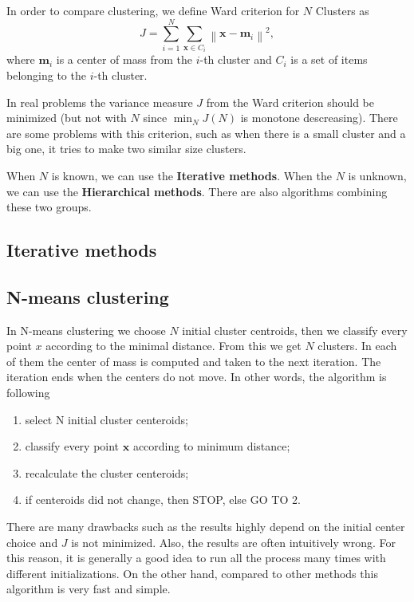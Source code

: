 \begin{define}
In order to compare clustering, we define Ward criterion for $N$ Clusters as
$$ J=\sum_{i=1}^N \sum_{\textbf{x}\in C_i}\left\|\textbf{x}-\textbf{m}_i\right\|^2, $$
where $\textbf{m}_i$ is a center of mass from the $i$-th cluster and $C_i$ is a set of items belonging to the $i$-th cluster.
\end{define}

In real problems the variance measure $J$ from the Ward criterion should be minimized (but not with $N$ since $\min_N J(N)$ is monotone descreasing). There are some problems with this criterion, such as when there is a small cluster and a big one, it tries to make two similar size clusters.

When $N$ is known, we can use the \textbf{Iterative methods}. When the $N$ is unknown, we can use the \textbf{Hierarchical methods}. There are also algorithms combining these two groups.

\subsection{Iterative methods}
\subsection*{N-means clustering}
In N-means clustering we choose $N$ initial cluster centroids, then we classify every point $x$ according to the minimal distance. From this we get $N$ clusters. In each of them the center of mass is computed and taken to the next iteration. The iteration ends when the centers do not move. In other words, the algorithm is following

\begin{enumerate}
	\item select N initial cluster centeroids;
	\item classify every point $\textbf{x}$ according to minimum distance;
	\item recalculate the cluster centeroids;
	\item if centeroids did not change, then STOP, else GO TO 2.
\end{enumerate}

There are many drawbacks such as the results highly depend on the initial center choice and $J$ is not minimized. Also, the results are often intuitively wrong. For this reason, it is generally a good idea to run all the process many times with different initializations. On the other hand, compared to other methods this algorithm is very fast and simple.

